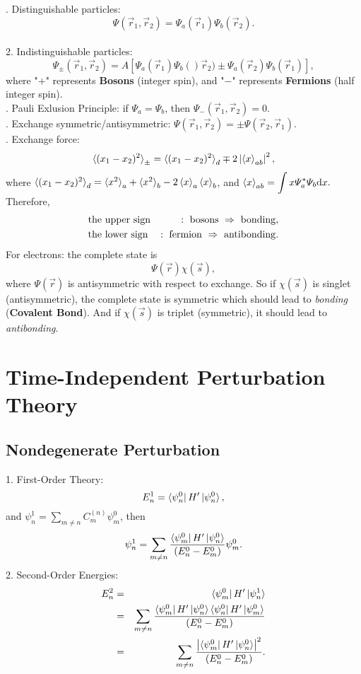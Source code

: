 \documentclass[12pt, 
]{article}
\begin{document}
. Distinguishable particles:
\[
	\varPsi(\vec{r}_1,\vec{r}_2)=\varPsi_a(\vec{r}_1)\varPsi_b(\vec{r}_2).
\]\\
2. Indistinguishable particles:
\[
	\varPsi_\pm(\vec{r}_1,\vec{r}_2)=A[\varPsi_a(\vec{r}_1)\varPsi_b()\vec{r}_2)\pm\varPsi_a(\vec{r}_2)\varPsi_b(\vec{r}_1)],
\]
where "$+$" represents {\bf Bosons} (integer spin), and "$-$" represents {\bf Fermions} (half integer spin).\\

. Pauli Exlusion Principle: if $\varPsi_a=\varPsi_b$, then $\varPsi_{-}(\vec{r}_1,\vec{r}_2)=0$.\\

. Exchange symmetric/antisymmetric: $\varPsi(\vec{r}_1,\vec{r}_2)=\pm\varPsi(\vec{r}_2,\vec{r}_1)$.\\

. Exchange force:
\[
	\braket{(x_1-x_2)^2}_\pm=\braket{(x_1-x_2)^2}_d\mp 2\left|\braket{x}_{ab}\right|^2,
\]
where $\braket{(x_1-x_2)^2}_d=\braket{x^2}_a+\braket{x^2}_b-2\braket{x}_a\braket{x}_b$, and $\displaystyle\braket{x}_{ab}=\int x\varPsi_a^*\varPsi_b{\rm d}x.$ Therefore, 
\begin{eqnarray*}
	 &\rm the~upper~sign&\rm :~bosons~\Rightarrow~bonding,\\
	 &\rm the~lower~sign&\rm :~fermion~\Rightarrow~antibonding.
\end{eqnarray*}
For electrons: the complete state is
\[
	\varPsi(\vec{r})\chi(\vec{s}),
\]
where $\varPsi(\vec{r})$ is antisymmetric with respect to exchange. So if $\chi(\vec{s})$ is singlet (antisymmetric), the complete state is symmetric which should lead to {\it bonding} ({\bf Covalent Bond}). And if $\chi(\vec{s})$ is triplet (symmetric), it should lead to {\it antibonding}.
\newpage

\section{Time-Independent Perturbation Theory}
\subsection{Nondegenerate Perturbation}
1. First-Order Theory:
\begin{equation}\label{eq:24}
	E^1_n=\bra{\psi_n^0}H'\ket{\psi_n^0},
\end{equation}
and $\psi^1_n=\sum_{m\neq n}C_m^{(n)}\psi_m^0$, then
\[
	\psi^1_n=\sum_{m\neq n}\frac{\bra{\psi_m^0}H'\ket{\psi_n^0}}{(E_n^0-E_m^0)}\psi_m^0.
\]
2. Second-Order Energies:
\begin{eqnarray*}
	E_n^2&=&\bra{\psi_m^0}H'\ket{\psi_n^1}\\
	&=&\sum_{m\neq n}\frac{\bra{\psi_m^0}H'\ket{\psi_n^0}\bra{\psi_n^0}H'\ket{\psi_m^0}}{(E_n^0-E_m^0)}\\
	&=&\sum_{m\neq n}\frac{\left|\bra{\psi_m^0}H'\ket{\psi_n^0}\right|^2}{(E_n^0-E_m^0)}.
\end{eqnarray*}
\end{document}
